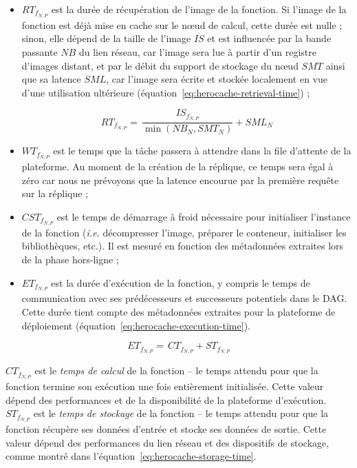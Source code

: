 \begin{itemize}
    \item ${RT}_{{f}_{N, P}}$ est la durée de récupération de l'image de la fonction. Si l'image de la fonction est déjà mise en cache sur le nœud de calcul, cette durée est nulle ; sinon, elle dépend de la taille de l'image $IS$ et est influencée par la bande passante $NB$ du lien réseau, car l'image sera lue à partir d'un registre d'images distant, et par le débit du support de stockage du nœud $SMT$ ainsi que sa latence $SML$, car l'image sera écrite et stockée localement en vue d'une utilisation ultérieure (équation~\ref{eq:herocache-retrieval-time}) ;

    \begin{equation}
        {RT}_{{f}_{N, P}} = \, \frac{IS_{{f}_{N, P}}}{\min (NB_{N}, SMT_{N})} + SML_{N}
        \label{eq:herocache-retrieval-time}
    \end{equation}

    \item ${WT}_{{f}_{N, P}}$ est le temps que la tâche passera à attendre dans la file d'attente de la plateforme. Au moment de la création de la réplique, ce temps sera égal à zéro car nous ne prévoyons que la latence encourue par la première requête sur la réplique ;
    \item ${CST}_{{f}_{N, P}}$ est le temps de démarrage à froid nécessaire pour initialiser l'instance de la fonction (\textit{i.e.} décompresser l'image, préparer le conteneur, initialiser les bibliothèques, etc.). Il est mesuré en fonction des métadonnées extraites lors de la phase hors-ligne ;
    \item ${ET}_{{f}_{N, P}}$ est la durée d'exécution de la fonction, y compris le temps de communication avec ses prédécesseurs et successeurs potentiels dans le DAG. Cette durée tient compte des métadonnées extraites pour la plateforme de déploiement (équation~\ref{eq:herocache-execution-time}).
\end{itemize}

\begin{equation}
    {ET}_{{f}_{N, P}} = \, {CT}_{{f}_{N, P}} + {ST}_{{f}_{N, P}}
\label{eq:herocache-execution-time}
\end{equation}

${CT}_{{f}_{N, P}}$ est le \textit{temps de calcul} de la fonction -- le temps attendu pour que la fonction termine son exécution une fois entièrement initialisée. Cette valeur dépend des performances et de la disponibilité de la plateforme d'exécution. ${ST}_{{f}_{N, P}}$ est le \textit{temps de stockage} de la fonction -- le temps attendu pour que la fonction récupère ses données d'entrée et stocke ses données de sortie. Cette valeur dépend des performances du lien réseau et des dispositifs de stockage, comme montré dans l'équation~\ref{eq:herocache-storage-time}.

